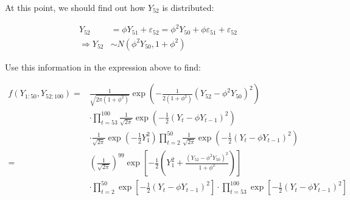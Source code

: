 {{At this point, we should find out how $Y_{52}$ is distributed:

$$
\begin{aligned}
Y_{52}&=\phi Y_{51}+\varepsilon_{52} =\phi^{2} Y_{50}+\phi \varepsilon_{51}+\varepsilon_{52} \\
\Rightarrow Y_{52}& \sim N\left(\phi^{2} Y_{50} , 1+\phi^{2}\right)
\end{aligned}
$$

Use this information in the expression above to find:

$$
\begin{aligned}
f \left( Y_{1: 50}, Y_{52: 100}\right) =&\frac{1}{\sqrt{2 \pi\left(1+\phi^{2}\right)}} \exp \left(-\frac{1}{2\left(1+\phi^{2}\right)}\left(Y_{52}-\phi^{2} Y_{50}\right)^{2}\right) \\
& \cdot\prod_{t=53}^{100} \frac{1}{\sqrt{2 \pi}} \exp \left(-\frac{1}{2}\left(Y_{t}-\phi Y_{t-1}\right)^{2}\right) \\
& \cdot\frac{1}{\sqrt{2 \pi}} \exp \left(-\frac{1}{2} Y_{1}^{2}\right) \prod_{t=2}^{50} \frac{1}{\sqrt{2 \pi}} \exp \left(-\frac{1}{2}\left(Y_{t}-\phi Y_{t-1}\right)^{2}\right) \\
=&\left(\frac{1}{\sqrt{2 \pi}}\right)^{99} \exp \left[-\frac{1}{2}\left(Y_{1}^{2}+\frac{\left(Y_{52}-\phi^{2} Y_{50}\right)^{2}}{1+\phi^{2}}\right) \right] \\
& \cdot \prod_{t=2}^{50} \exp \left[-\frac{1}{2}\left(Y_{t}-\phi Y_{t-1}\right)^{2}\right] \cdot \prod_{t=53}^{100} \exp \left[-\frac{1}{2}\left(Y_{t}-\phi Y_{t-1}\right)^{2}\right]
\end{aligned}
$$

}
{
}}
